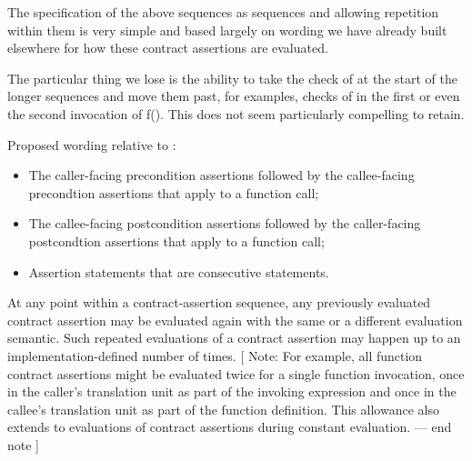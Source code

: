 The specification of the above sequences as sequences
and allowing repetition within them is very simple and based
largely on wording we have already built elsewhere for how
these contract assertions are evaluated.

The particular thing we lose is the ability to take
the check of  at the start of the longer
sequences and move them past, for examples, checks of
 in the first or even the second invocation of f().
This does not seem particularly compelling to retain.

Proposed wording relative to \cite{P2900R11}:

\begin{adjustwidth}{0.5cm}{0.5cm}
\begin{addedblock}
\begin{itemize}
\item The caller-facing precondition assertions followed by the callee-facing precondtion assertions that apply to a function call;
\item The callee-facing postcondition assertions followed by the caller-facing postcondtion assertions that apply to a function call;
\item Assertion statements that are consecutive statements.
\end{itemize}
\end{addedblock}

At any point within a contract-assertion sequence, any previously evaluated contract assertion
may be evaluated again with the same or a different evaluation semantic. Such repeated
evaluations of a contract assertion may happen up to an implementation-defined number
of times. [ Note: For example, all function contract assertions might be evaluated twice for
a single function invocation, once in the caller’s translation unit as part of the invoking
expression and once in the callee’s translation unit as part of the function definition. This
allowance also extends to evaluations of contract assertions during constant evaluation.
— end note ]
\end{adjustwidth}




\renewcommand{\addcontentsline}[3]{}%







